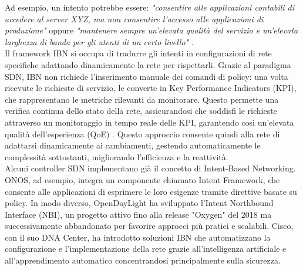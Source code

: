 Ad esempio, un intento potrebbe essere: \textit{"consentire alle applicazioni contabili di accedere al server XYZ, ma non consentire l’accesso alle applicazioni di produzione"} oppure
\textit{"mantenere sempre un'elevata qualità del servizio e un'elevata larghezza di banda per gli utenti di un certo livello"} \cite{esempint}.
\\Il framework IBN si occupa di tradurre gli intenti
in configurazioni di rete specifiche adattando dinamicamente la rete per rispettarli. %
Grazie al paradigma SDN, IBN non richiede l'inserimento manuale dei comandi di policy: una volta ricevute le richieste di servizio, le converte in Key Performance Indicators (KPI), che rappresentano le metriche rilevanti da monitorare. 
Questo permette una verifica continua dello stato della rete, assicurandosi che soddisfi le richieste attraverso un monitoraggio in tempo reale delle KPI, garantendo così un'elevata qualità dell'esperienza (QoE) \cite{qoe}.
Questo approccio consente quindi alla rete di adattarsi dinamicamente ai cambiamenti, gestendo automaticamente le complessità sottostanti, migliorando l'efficienza e la reattività.
\\Alcuni controller SDN implementano già il concetto di Intent-Based Networking. 
\\ONOS, ad esempio, integra un componente chiamato Intent Framework, che consente alle applicazioni di esprimere le loro esigenze tramite direttive basate su policy. 
In modo diverso, OpenDayLight ha sviluppato l'Intent Northbound Interface (NBI), un progetto attivo fino alla release "Oxygen" del 2018 ma successivamente abbandonato per favorire approcci più pratici e scalabili. 
Cisco, con il suo DNA Center, ha introdotto soluzioni IBN che automatizzano la configurazione e l'implementazione della rete grazie all'intelligenza artificiale e all'apprendimento automatico concentrandosi principalmente sulla sicurezza. 
